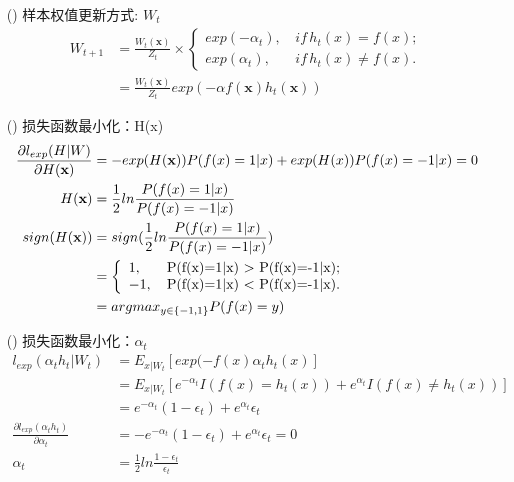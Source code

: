 \documentclass[a4paper]{article}
\begin{document}
				\begin{itemize}
					\item[(\romannumeral1)] 样本权值更新方式: $W_t$
											\begin{align*}
												W_{t+1} & = \frac{W_t(\textbf{x})}{Z_t}\times \left \{\begin{array}{ll}
															 					 					exp(-\alpha_t),\, & if\, h_t(x)=f(x);\\
															 					 				    exp(\alpha_t),\, & if\, h_t(x)\neq f(x).
															 					 			 		\end{array} \right. \\
														  & = \frac{W_t(\textbf{x})}{Z_t}exp(-\alpha f(\textbf{x})h_t(\textbf{x}))
										   \end{align*}
					\item[(\romannumeral2)] 损失函数最小化：H(x)
						\begin{align*}
							\frac{\partial l_{exp}(H|W)}{\partial H(\textbf{x})} & = -exp(H(\textbf{x}))P(f(x)=1|x)+exp(H(x))P(f(x)=-1|x)=0\\
																   H(\textbf{x}) & = \frac{1}{2}ln\frac{P(f(x)=1|x)}{P(f(x)=-1|x)}\\
															 sign(H(\textbf{x})) & = sign(\frac{1}{2}ln\frac{P(f(x)=1|x)}{P(f(x)=-1|x)}) \\
															 					 & = \left \{\begin{array}{ll}
															 					 				1,\, &$P(f(x)=1|x) > P(f(x)=-1|x)$;\\
															 					 				-1,\, &$P(f(x)=1|x) < P(f(x)=-1|x)$.
															 					 			 \end{array} \right.\\
															 					 & = arg max_{y\in \{-1,1\}} P(f(x)=y)
						\end{align*}
					\item[(\romannumeral3)] 损失函数最小化：$\alpha_t$
						\begin{align*}
							l_{exp}(\alpha_t h_t|W_t) & = E_{x|W_t}[exp(-f(x)\alpha_th_t(x)] \\
												 & = E_{x|W_t}[e^{-\alpha_t}I(f(x)=h_t(x))+e^{\alpha_t}I(f(x)\neq h_t(x))] \\
												 & = e^{-\alpha_t}(1-\epsilon_t) + e^{\alpha_t}\epsilon_t\\
							\frac{\partial l_{exp}(\alpha_th_t)}{\partial \alpha_t} & = -e^{-\alpha_t}(1-\epsilon_t) + e^{\alpha_t}\epsilon_t = 0 \\
										\alpha_t & = \frac{1}{2}ln\frac{1-\epsilon_t}{\epsilon_t}

\end{align*}
\end{itemize}
\end{document}
